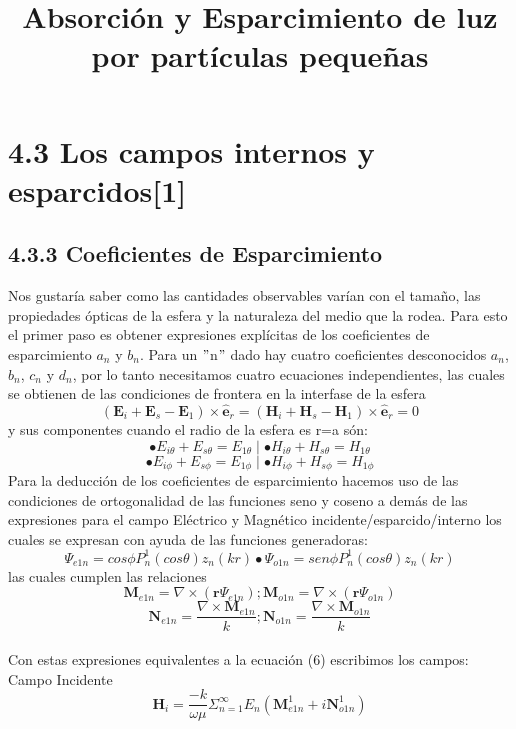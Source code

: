 \documentclass[11pt]{article}
\title{Absorción y Esparcimiento de luz por partículas pequeñas}
\author{\Name{} \texttt{\Login}}
\date{}
\begin{document}
\section*{4.3 Los campos internos y esparcidos[1]}
\subsection*{4.3.3 Coeficientes de Esparcimiento}
Nos gustaría saber como las cantidades observables varían con el tamaño, las propiedades ópticas de la esfera y la naturaleza del medio que la rodea. Para esto el primer paso es obtener expresiones explícitas de los coeficientes de esparcimiento $a_{n}$ y $b_{n}$.
Para un $"$n$"$ dado hay cuatro coeficientes desconocidos $a_{n}$, $b_{n}$, $c_{n}$ y $d_{n}$, por lo tanto necesitamos cuatro ecuaciones independientes, las cuales se obtienen de las condiciones de frontera en la interfase de la esfera 
\begin{equation}
(\textbf{E}_{i}+\textbf{E}_{s}-\textbf{E}_{1}) \times \hat{\textbf{e}}_{r} = (\textbf{H}_{i}+\textbf{H}_{s}-\textbf{H}_{1}) \times \hat{\textbf{e}}_{r}=0
\end{equation}
y sus componentes cuando el radio de la esfera es r=a són:
\begin{equation}\bullet E_{i\theta}+E_{s\theta}=E_{1\theta}  \mid
\bullet H_{i\theta}+H_{s\theta}=H_{1\theta}
\end{equation}
\begin{equation*}\bullet E_{i\phi}+E_{s\phi}=E_{1\phi}   \mid
\bullet H_{i\phi}+H_{s\phi}=H_{1\phi}
\end{equation*}
Para la deducción de los coeficientes de esparcimiento hacemos uso de las condiciones de ortogonalidad de las funciones seno y coseno a demás de las expresiones para el campo Eléctrico y Magnético incidente/esparcido/interno los cuales se expresan con ayuda de las funciones generadoras: $$\Psi_{e1n}=cos\phi P_{n}^{1}(cos\theta)z_{n}(kr)\bullet \Psi_{o1n}=sen\phi P_{n}^{1}(cos\theta)z_{n}(kr)$$
las cuales cumplen las relaciones
$$\textbf{M}_{e1n}=\nabla \times (\textbf{r}\Psi_{e1n}); \textbf{M}_{o1n}=\nabla \times (\textbf{r}\Psi_{o1n})$$
$$\textbf{N}_{e1n}=\frac{\nabla \times \textbf{M}_{e1n}}{k} ; \textbf{N}_{o1n}=\frac{\nabla \times \textbf{M}_{o1n}}{k}$$
\\ Con estas expresiones  equivalentes a la ecuación (6) escribimos los campos:
\\
Campo Incidente
\begin{equation}
\textbf{H}_{i}=\frac{-k}{\omega \mu} \Sigma_{n=1}^{\infty} E_{n}(\textbf{M}_{e1n}^{1}+i\textbf{N}_{o1n}^{1})
\end{equation}
\end{document}
